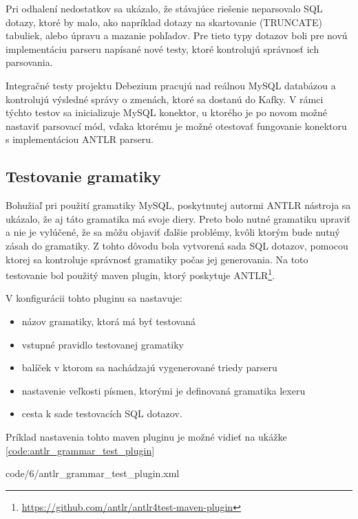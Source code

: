 Pri odhalení nedostatkov sa ukázalo, že stávajúce riešenie neparsovalo SQL dotazy, ktoré by malo, ako napríklad dotazy na skartovanie (TRUNCATE) tabuliek, alebo úpravu a mazanie pohľadov. Pre tieto typy dotazov boli pre novú implementáciu parseru napísané nové testy, ktoré kontrolujú správnosť ich parsovania.

Integračné testy projektu Debezium pracujú nad reálnou MySQL databázou a kontrolujú výsledné správy o zmenách, ktoré sa dostanú do Kafky. V rámci týchto testov sa inicializuje MySQL konektor, u ktorého je po novom možné nastaviť parsovací mód, vďaka ktorému je možné otestovať fungovanie konektoru s implementáciou ANTLR parseru.

\subsection{Testovanie gramatiky}
Bohužiaľ pri použití gramatiky MySQL, poskytnutej autormi ANTLR nástroja sa ukázalo, že aj táto gramatika má svoje diery. Preto bolo nutné gramatiku upraviť a nie je vylúčené, že sa môžu objaviť ďalšie problémy, kvôli ktorým bude nutný zásah do gramatiky. Z tohto dôvodu bola vytvorená sada SQL dotazov, pomocou ktorej sa kontroluje správnosť gramatiky počas jej generovania. Na toto testovanie bol použitý maven plugin, ktorý poskytuje ANTLR\footnote{\url{https://github.com/antlr/antlr4test-maven-plugin}}. 

V konfigurácii tohto pluginu sa nastavuje:

\begin{itemize}
\item názov gramatiky, ktorá má byť testovaná
\item vstupné pravidlo testovanej gramatiky
\item balíček v ktorom sa nachádzajú vygenerované triedy parseru
\item nastavenie veľkosti písmen, ktorými je definovaná gramatika lexeru
\item cesta k sade testovacích SQL dotazov.
\end{itemize}

Príklad nastavenia tohto maven pluginu je možné vidieť na ukážke \ref{code:antlr_grammar_test_plugin}


            {code/6/antlr_grammar_test_plugin.xml}

